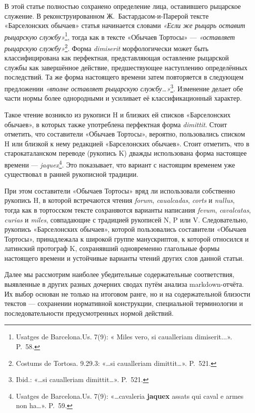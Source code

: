 В этой статье полностью сохранено определение лица, оставившего рыцарское служение. В реконструированном Ж.~Бастардасом-и-Парерой тексте «Барселонских обычаев» статья начинается словами \emph{«Если же рыцарь оставит рыцарскую службу»}\footnote{Usatges de Barcelona.Us. 7(9): « Miles vero, si caualleriam dimiserit...». P.~58.}, тогда как в тексте «Обычаев Тортосы» --- \emph{«оставляет рыцарскую службу»}\footnote{Costums de Tortosa. 9.29.3: «…si caualleriam dimittit…». P.~521.}. Форма \emph{dimiserit} морфологически может быть классифицирована как перфектная, представляющая оставление рыцарской службы как завершённое действие, предшествующее наступлению определённых последствий. Та же форма настоящего времени затем повторяется в следующем предложении \emph{«вполне оставляет рыцарскую службу…»}\footnote{Ibid.: «…si caualleriam dimittit…». P.~521.}. Изменение делает обе части нормы более однородными и усиливает её классификационный характер.

Такое чтение возникло из рукописи H и близких ей списков «Барселонских обычаев», в которых также употреблена перфектная форма \emph{dimittit}. Стоит отметить, что составители «Обычаев Тортосы», вероятно, пользовались списком H или близкой к нему редакцией «Барселонских обычаев». Стоит отметить, что в старокаталанском переводе (рукопись K) дважды использована форма настоящее времени --- \emph{jaquex}\footnote{Usatges de Barcelona.Us. 7(9): «…cavaleria\textbf{ jaquex} assats qui caval e armes non ha…». P.~59.}. Это показывает, что вариант с настоящим временем уже существовал в ранней рукописной традиции.

При этом составители «Обычаев Тортосы» вряд ли использовали собственно рукопись H, в которой встречаются чтения \emph{forum}, \emph{caualcadas}, \emph{corts} и \emph{nullus}, тогда как в тортосском тексте сохраняются варианты написания \emph{fevum}, \emph{cavalcatas}, \emph{curias} и \emph{miles}, совпадающие с традицией рукописей N, P или V. Следовательно, рукопись «Барселонских обычаев», которой пользовались составители «Обычаев Тортосы», принадлежала к широкой группе манускриптов, к которой относился и латинский протограф K, сохранявший одновременно глагольные формы настоящего времени и устойчивые варианты чтений других слов данной статьи.

Далее мы рассмотрим наиболее убедительные содержательные соответствия, выявленные в других разных дочерних сводах путём анализа markdown-отчёта. Их выбор основан не только на итоговом ранге, но и на содержательной близости текстов --- сохранении нормативной конструкции, специальной терминологии и последовательности предусмотренных нормой действий.

